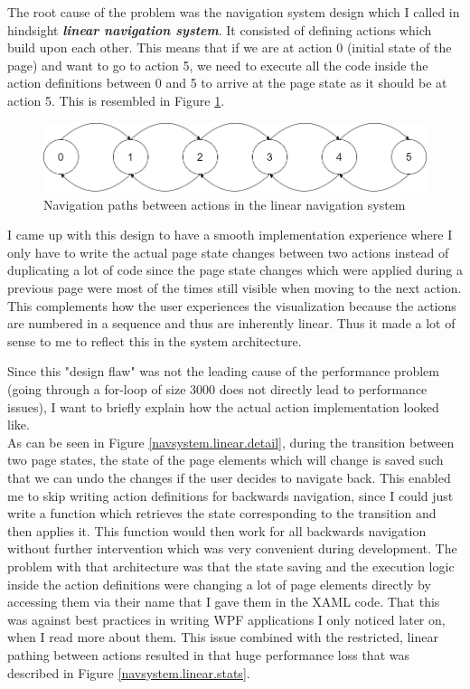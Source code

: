 \par

The root cause of the problem was the navigation system design which I called in hindsight \textbf{\textit{linear navigation system}}. It consisted of defining actions which build upon each other. This means that if we are at action 0 (initial state of the page) and want to go to action 5, we need to execute all the code inside the action definitions between 0 and 5 to arrive at the page state as it should be at action 5. This is resembled in Figure \ref{navsystem.linear.overview}.

\begin{figure}
\caption{Navigation paths between actions in the linear navigation system}
\label{navsystem.linear.overview}
\includegraphics[width=\textwidth]{figures/navigationsystem-linear-overview.png}
\end{figure}

I came up with this design to have a smooth implementation experience where I only have to write the actual page state changes between two actions instead of duplicating a lot of code since the page state changes which were applied during a previous page were most of the times still visible when moving to the next action. This complements how the user experiences the visualization because the actions are numbered in a sequence and thus are inherently linear. Thus it made a lot of sense to me to reflect this in the system architecture.

\par

Since this "design flaw" was not the leading cause of the performance problem (going through a for-loop of size 3000 does not directly lead to performance issues), I want to briefly explain how the actual action implementation looked like.\\
As can be seen in Figure \ref{navsystem.linear.detail}, during the transition between two page states, the state of the page elements which will change is saved such that we can undo the changes if the user decides to navigate back. This enabled me to skip writing action definitions for backwards navigation, since I could just write a function which retrieves the state corresponding to the transition and then applies it. This function would then work for all backwards navigation without further intervention which was very convenient during development.
The problem with that architecture was that the state saving and the execution logic inside the action definitions were changing a lot of page elements directly by accessing them via their name that I gave them in the XAML code. That this was against best practices in writing WPF applications I only noticed later on, when I read more about them. This issue combined with the restricted, linear pathing between actions resulted in that huge performance loss that was described in Figure \ref{navsystem.linear.stats}.

